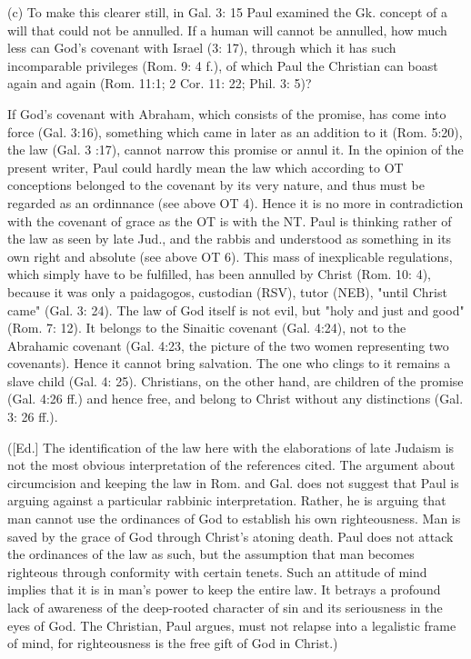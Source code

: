 				(c) To make this clearer still, in Gal. 3: 15 Paul examined the Gk. concept of a will that could not be annulled. If a human will cannot be annulled, how much less can God's covenant with Israel (3: 17), through which it has such incomparable privileges (Rom. 9: 4 f.), of which Paul the Christian can boast again and again (Rom. 11:1; 2 Cor. 11: 22; Phil. 3: 5)? 

				If God's covenant with Abraham, which consists of the promise, has come into force (Gal. 3:16), something which came in later as an addition to it (Rom. 5:20), the law (Gal. 3 :17), cannot narrow this promise or annul it. In the opinion of the present writer, Paul could hardly mean the law which according to OT conceptions belonged to the covenant by its very nature, and thus must be regarded as an ordinnance (see above OT 4). Hence it is no more in contradiction with the covenant of grace as the OT is with the NT. Paul is thinking rather of the law as seen by late Jud., and the rabbis and understood as something in its own right and absolute (see above OT 6). This mass of inexplicable regulations, which simply have to be fulfilled, has been annulled by Christ (Rom. 10: 4), because it was only a paidagogos, custodian (RSV), tutor (NEB), "until Christ came" (Gal. 3: 24). The law of God itself is not evil, but "holy and just and good" (Rom. 7: 12). It belongs to the Sinaitic covenant (Gal. 4:24), not to the Abrahamic covenant (Gal. 4:23, the picture of the two women representing two covenants). Hence it cannot bring salvation. The one who clings to it remains a slave child (Gal. 4: 25). Christians, on the other hand, are children of the promise (Gal. 4:26 ff.) and hence free, and belong to Christ without any distinctions (Gal. 3: 26 ff.). 

				([Ed.] The identification of the law here with the elaborations of late Judaism is not the most obvious interpretation of the references cited. The argument about circumcision and keeping the law in Rom. and Gal. does not suggest that Paul is arguing against a particular rabbinic interpretation. Rather, he is arguing that man cannot use the ordinances of God to establish his own righteousness. Man is saved by the grace of God through Christ's atoning death. Paul does not attack the ordinances of the law as such, but the assumption that man becomes righteous through conformity with certain tenets. Such an attitude of mind implies that it is in man's power to keep the entire law. It betrays a profound lack of awareness of the deep-rooted character of sin and its seriousness in the eyes of God. The Christian, Paul argues, must not relapse into a legalistic frame of mind, for righteousness is the free gift of God in Christ.) 

